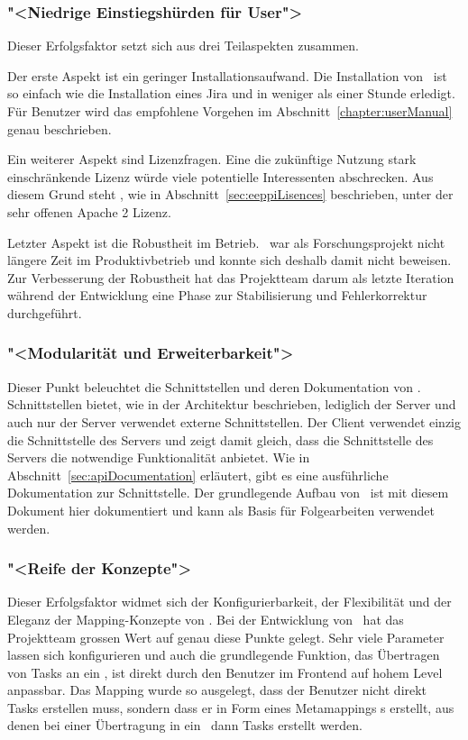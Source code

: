 		
		\subsubsection{"<Niedrige Einstiegshürden für User">}
			Dieser Erfolgsfaktor setzt sich aus drei Teilaspekten zusammen.
			
			Der erste Aspekt ist ein geringer Installationsaufwand.
			Die Installation von \eeppi\ ist so einfach wie  die Installation eines Jira und in weniger als einer Stunde erledigt. 
			Für Benutzer wird das empfohlene Vorgehen im Abschnitt~\ref{chapter:userManual} genau beschrieben.
			
			Ein weiterer Aspekt sind Lizenzfragen.
			Eine die zukünftige Nutzung stark einschränkende Lizenz würde viele potentielle Interessenten abschrecken.
			Aus diesem Grund steht \eeppi, wie in Abschnitt~\ref{sec:eeppiLisences} beschrieben, unter der sehr offenen Apache 2 Lizenz.
			
			Letzter Aspekt ist die Robustheit im Betrieb.
			\eeppi\ war als Forschungsprojekt nicht längere Zeit im Produktivbetrieb
			und konnte sich deshalb damit nicht beweisen.
			Zur Verbesserung der Robustheit hat das Projektteam darum als letzte Iteration während der Entwicklung eine Phase zur Stabilisierung und Fehlerkorrektur durchgeführt.
		
		
		\subsubsection{"<Modularität und Erweiterbarkeit">}
			Dieser Punkt beleuchtet die Schnittstellen und deren Dokumentation von \eeppi.
			Schnittstellen bietet, wie in der Architektur beschrieben, lediglich der Server
			und auch nur der Server verwendet externe Schnittstellen.
			Der Client verwendet einzig die Schnittstelle des Servers
			und zeigt damit gleich, dass die Schnittstelle des Servers die notwendige Funktionalität anbietet.
			Wie in Abschnitt~\ref{sec:apiDocumentation} erläutert, gibt es eine ausführliche Dokumentation zur Schnittstelle.
			Der grundlegende Aufbau von \eeppi\ ist mit diesem Dokument hier dokumentiert
			und kann als Basis für Folgearbeiten verwendet werden.
			
			
		\subsubsection{"<Reife der Konzepte">}
			Dieser Erfolgsfaktor widmet sich der Konfigurierbarkeit, der Flexibilität und der Eleganz der Mapping-Konzepte von \eeppi.
			Bei der Entwicklung von \eeppi\ hat das Projektteam grossen Wert auf genau diese Punkte gelegt.
			Sehr viele Parameter lassen sich konfigurieren und auch die grundlegende Funktion,
			das Übertragen von Tasks an ein \ppt, ist direkt durch den Benutzer im Frontend auf hohem Level anpassbar.
			Das Mapping wurde so ausgelegt, dass der Benutzer nicht direkt Tasks erstellen muss,
			sondern dass er in Form eines Metamappings \ttpl s erstellt,
			aus denen bei einer Übertragung in ein \ppt\ dann Tasks erstellt werden.
			
